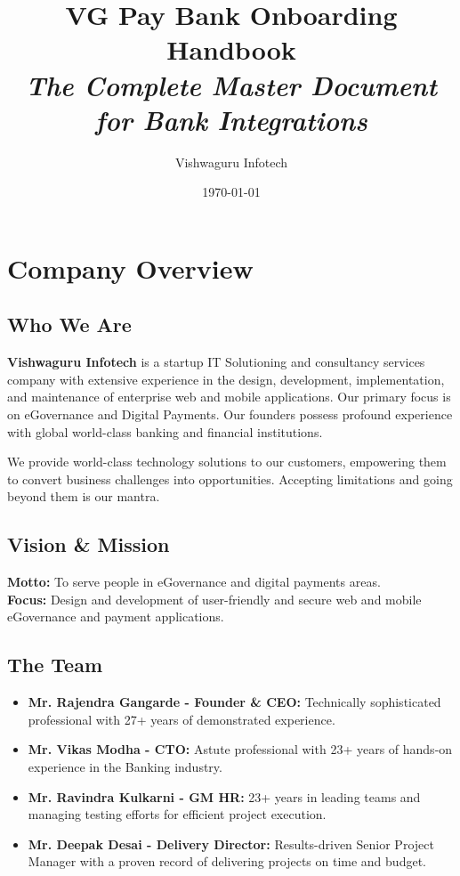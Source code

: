 \documentclass[11pt,a4paper]{article}
\title{\textbf{VG Pay Bank Onboarding Handbook}\\ \large \textit{The Complete Master Document for Bank Integrations}}
\author{Vishwaguru Infotech}
\date{\today}
\begin{document}
\maketitle
\tableofcontents
\newpage

\section{Company Overview}

\subsection{Who We Are}
\textbf{Vishwaguru Infotech} is a startup IT Solutioning and consultancy services company with extensive experience in the design, development, implementation, and maintenance of enterprise web and mobile applications. Our primary focus is on eGovernance and Digital Payments. Our founders possess profound experience with global world-class banking and financial institutions.

We provide world-class technology solutions to our customers, empowering them to convert business challenges into opportunities. Accepting limitations and going beyond them is our mantra.

\subsection{Vision \& Mission}
\textbf{Motto:} To serve people in eGovernance and digital payments areas.\\
\textbf{Focus:} Design and development of user-friendly and secure web and mobile eGovernance and payment applications.

\subsection{The Team}
\begin{itemize}
    \item \textbf{Mr. Rajendra Gangarde - Founder \& CEO:} Technically sophisticated professional with 27+ years of demonstrated experience.
    \item \textbf{Mr. Vikas Modha - CTO:} Astute professional with 23+ years of hands-on experience in the Banking industry.
    \item \textbf{Mr. Ravindra Kulkarni - GM HR:} 23+ years in leading teams and managing testing efforts for efficient project execution.
    \item \textbf{Mr. Deepak Desai - Delivery Director:} Results-driven Senior Project Manager with a proven record of delivering projects on time and budget.
\end{itemize}
\end{document}
